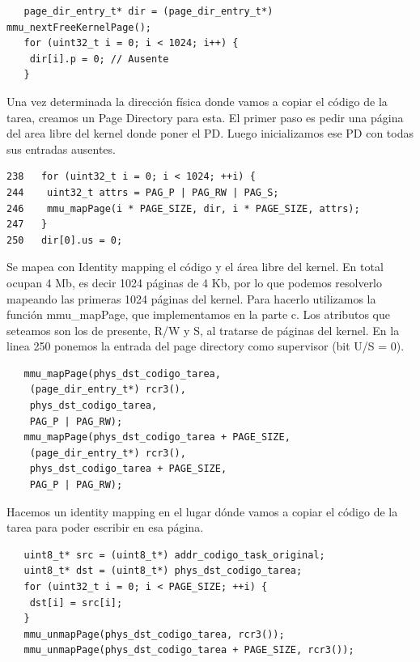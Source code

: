 \documentclass[a4paper]{article}
\newenvironment{codesnippet}{%
	\begin{Sbox}\begin{minipage}{\textwidth}\sffamily\small}%
	{\end{minipage}\end{Sbox}%
		\begin{center}%
		\vspace{-0.4cm}\colorbox{litegrey}{\TheSbox}\end{center}\vspace{0.3cm}}
\begin{document}
\begin{codesnippet}
  \begin{verbatim}
   page_dir_entry_t* dir = (page_dir_entry_t*) mmu_nextFreeKernelPage();
   for (uint32_t i = 0; i < 1024; i++) {
    dir[i].p = 0; // Ausente
   }
  \end{verbatim}
\end{codesnippet}

Una vez determinada la dirección física donde vamos a copiar el código de la tarea, creamos un Page Directory para esta.
El primer paso es pedir una página del area libre del kernel donde poner el PD. Luego inicializamos ese PD con todas sus
entradas ausentes.

\begin{codesnippet}
  \begin{verbatim}
238   for (uint32_t i = 0; i < 1024; ++i) {
244    uint32_t attrs = PAG_P | PAG_RW | PAG_S;
246    mmu_mapPage(i * PAGE_SIZE, dir, i * PAGE_SIZE, attrs);
247   }
250   dir[0].us = 0;
  \end{verbatim}
\end{codesnippet}

Se mapea con Identity mapping el código y el área libre del kernel. En total ocupan 4 Mb, es decir 1024 páginas de 4 Kb,
por lo que podemos resolverlo mapeando las primeras 1024 páginas del kernel. Para hacerlo utilizamos la función
mmu\_mapPage, que implementamos en la parte c. Los atributos que seteamos son los de presente, R/W y S, al tratarse de
páginas del kernel. En la linea 250 ponemos la entrada del page directory como supervisor (bit U/S = 0).

\begin{codesnippet}
  \begin{verbatim}
   mmu_mapPage(phys_dst_codigo_tarea,
    (page_dir_entry_t*) rcr3(),
    phys_dst_codigo_tarea,
    PAG_P | PAG_RW);
   mmu_mapPage(phys_dst_codigo_tarea + PAGE_SIZE,
    (page_dir_entry_t*) rcr3(),
    phys_dst_codigo_tarea + PAGE_SIZE,
    PAG_P | PAG_RW);
  \end{verbatim}
\end{codesnippet}

Hacemos un identity mapping en el lugar dónde vamos a copiar el código de la tarea para poder escribir en esa página.

\begin{codesnippet}
  \begin{verbatim}
   uint8_t* src = (uint8_t*) addr_codigo_task_original;
   uint8_t* dst = (uint8_t*) phys_dst_codigo_tarea;
   for (uint32_t i = 0; i < PAGE_SIZE; ++i) {
    dst[i] = src[i];
   }
   mmu_unmapPage(phys_dst_codigo_tarea, rcr3());
   mmu_unmapPage(phys_dst_codigo_tarea + PAGE_SIZE, rcr3());
  \end{verbatim}
\end{codesnippet}
\end{document}
